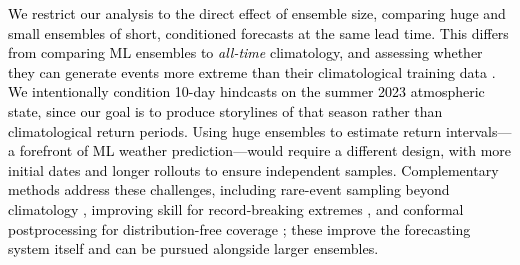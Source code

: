 \documentclass[draft]{agujournal2019}
\newcommand{\newTxt}{\textcolor{black}}
\begin{document}


\newTxt{We restrict our analysis to the direct effect of ensemble size, comparing huge and small ensembles of short, conditioned forecasts at the same lead time. This differs from comparing ML ensembles to \textit{all-time} climatology, and assessing whether they can generate events more extreme than their climatological training data \citep{Sun2025,Zhang2026}. We intentionally condition 10-day hindcasts on the summer 2023 atmospheric state, since our goal is to produce storylines of that season rather than climatological return periods. Using huge ensembles to estimate return intervals---a forefront of ML weather prediction---would require a different design, with more initial dates and longer rollouts to ensure independent samples.  Complementary methods address these challenges, including rare-event sampling beyond climatology \citep{Lancelin2025}, improving skill for record-breaking extremes \citep{Zhang2026}, and conformal postprocessing for distribution-free coverage \citep{Gopakumar2026}; these improve the forecasting system itself and can be pursued alongside larger ensembles.}
\end{document}
